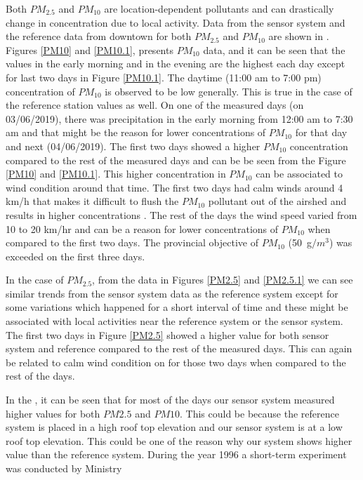 Both $PM_{2.5}$ and $PM_{10}$ are location-dependent pollutants and can drastically change in concentration due to local activity. Data from the sensor system and the reference data from downtown for both $PM_{2.5}$ and $PM_{10}$ are shown in . Figures \ref{PM10} and \ref{PM10.1}, presents $PM_{10}$ data, and it can be seen that the values in the early morning and in the evening are the highest each day except for last two days in Figure \ref{PM10.1}. The daytime (11:00 am to 7:00 pm) concentration of $PM_{10}$ is observed to be low generally. This is true in the case of the reference station values as well. On one of the measured days (on 03/06/2019), there was precipitation in the early morning from 12:00 am to 7:30 am and that might be the reason for lower concentrations of $PM_{10}$ for that day and next (04/06/2019). The first two days showed a higher $PM_{10}$ concentration compared to the rest of the measured days and can be be seen from the Figure \ref{PM10} and \ref{PM10.1}. This higher concentration in $PM_{10}$ can be associated to wind condition around that time. The first two days had calm winds around 4 km/h that makes it difficult to flush the $PM_{10}$ pollutant out of the airshed and results in higher concentrations \cite{EnvironmentalQualitySectionMoE2012}. The rest of the days the wind speed varied from 10 to 20 km/hr and can be a reason for lower concentrations of $PM_{10}$ when compared to the first two days. The provincial objective of $PM_{10}$ (50~{\textmu}g$/m^3$) was exceeded on the first three days.


In the case of $PM_{2.5}$,  from the data in Figures \ref{PM2.5} and \ref{PM2.5.1} we can see similar trends from the sensor system data as the reference system except for some variations which happened for a short interval of time and these might be associated with local activities near the reference system or the sensor system. The first two days in Figure \ref{PM2.5} showed a higher value for both sensor system and reference compared to the rest of the measured days. This can again be related to calm wind condition on for those two days when compared to the rest of the days. 


In the , it can be seen that for most of the days our sensor system measured higher values for both $PM2.5$ and $PM10$. This could be because the reference system is placed in a high roof top elevation and our sensor system is at a low roof top elevation. This could be one of the reason why our system shows higher value than the reference system. During the year 1996 a short-term experiment was conducted by Ministry 

